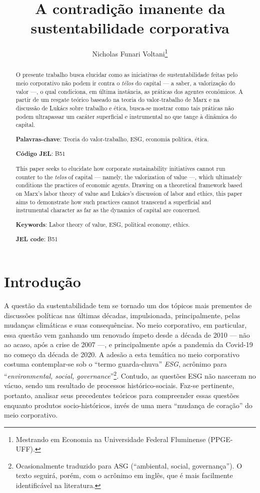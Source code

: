 \documentclass[12pt]{article}
\title{A contradição imanente da sustentabilidade corporativa}
\author{Nicholas Funari Voltani\footnote{Mestrando em Economia na Universidade Federal Fluminense (PPGE-UFF).}}
\date{}
\numberwithin{equation}{section}
\theoremstyle{plain}
\theoremstyle{definition}
\theoremstyle{remark}
\begin{document}
\maketitle
\begin{abstract}
    O presente trabalho busca elucidar como as iniciativas de sustentabilidade feitas pelo meio corporativo não podem ir contra o \textit{télos} do capital --- a saber, a valorização do valor ---, o qual condiciona, em última instância, as práticas dos agentes econômicos. A partir de um resgate teórico baseado na teoria do valor-trabalho de Marx e na discussão de Lukács sobre trabalho e ética, busca-se mostrar como tais práticas não podem ultrapassar um caráter superficial e instrumental no que tange à dinâmica do capital.

    \textbf{Palavras-chave}: Teoria do valor-trabalho, ESG, economia política, ética.

    \textbf{Código JEL}: B51
\end{abstract}

\begin{abstract}
    This paper seeks to elucidate how corporate sustainability initiatives cannot run counter to the \textit{telos} of capital --- namely, the valorization of value ---, which ultimately conditions the practices of economic agents. Drawing on a theoretical framework based on Marx's labor theory of value and Lukács's discussion of labor and ethics, this paper aims to demonstrate how such practices cannot transcend a superficial and instrumental character as far as the dynamics of capital are concerned. 

    \textbf{Keywords}: Labor theory of value, ESG, political economy, ethics.

    \textbf{JEL code}: B51
\end{abstract}



\section{Introdução}
A questão da sustentabilidade tem se tornado um dos tópicos mais prementes de discussões políticas nas últimas décadas, impulsionada, principalmente, pelas mudanças climáticas e suas consequências. No meio corporativo, em particular, essa questão vem ganhando um renovado ímpeto desde a década de 2010 --- não ao acaso, após a crise de 2007 ---, e principalmente após a pandemia da Covid-19 no começo da década de 2020. A adesão a esta temática no meio corporativo costuma contemplar-se sob o ``termo guarda-chuva'' \textit{ESG}, acrônimo para ``\textit{environmental, social, governance}''\footnote{Ocasionalmente traduzido para ASG (``ambiental, social, governança''). O texto seguirá, porém, com o acrônimo em inglês, que é mais facilmente identificável na literatura.}. Contudo, as questões ESG não nasceram no vácuo, sendo um resultado de processos histórico-sociais. Faz-se pertinente, portanto, analisar seus precedentes teóricos para compreender essas questões enquanto produtos socio-históricos, invés de uma mera ``mudança de coração'' do meio corporativo. 
\end{document}
